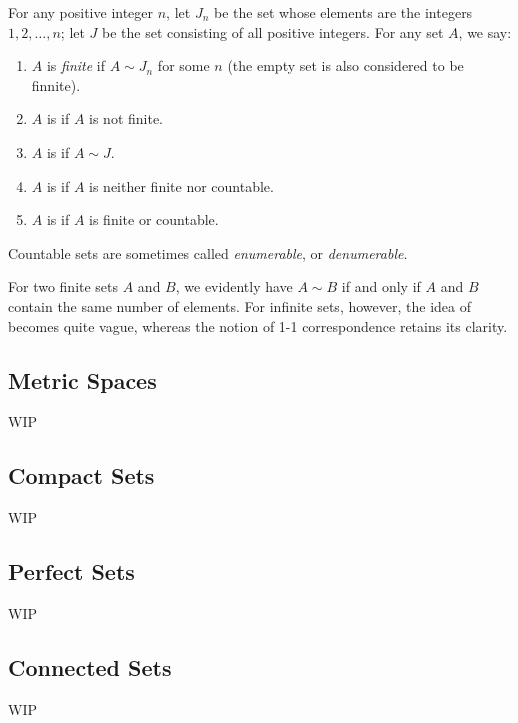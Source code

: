 \documentclass[../poma-note.tex]{subfiles}
\begin{document}
\begin{definition}
  For any positive integer $n$, let $J_n$ be the set whose elements are the integers $1,2,\dots,n$; let $J$ be
  the set consisting of all positive integers. For any set $A$, we say:
  \begin{enumerate}[label=(\alph*)]
    \item $A$ is \textit{finite} if $A \sim J_n$ for some $n$ (the empty set is also considered to be finnite).
    \item $A$ is \textit{} if $A$ is not finite.
    \item $A$ is \textit{} if $A \sim J$.
    \item $A$ is \textit{} if $A$ is neither finite nor countable.
    \item $A$ is \textit{} if $A$ is finite or countable.
  \end{enumerate}

  Countable sets are sometimes called \textit{enumerable}, or \textit{denumerable}.

  For two finite sets $A$ and $B$, we evidently have $A \sim B$ if and only if $A$ and $B$ contain the same number of
  elements. For infinite sets, however, the idea of  becomes quite vague,
  whereas the notion of 1-1 correspondence retains its clarity.
\end{definition}

\subsection*{Metric Spaces}

WIP

\subsection*{Compact Sets}

WIP

\subsection*{Perfect Sets}

WIP

\subsection*{Connected Sets}

WIP
\end{document}

